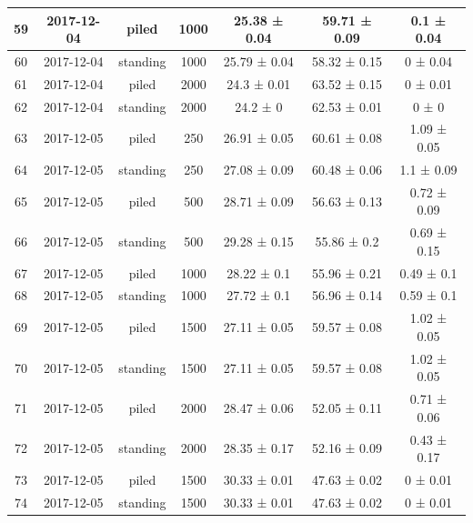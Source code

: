 \documentclass[11pt,a4paper]{article}
\begin{document}
\begin{table}
\begin{tabular}[t]{c|c|c|c|c|c|c}
\hline
59 & 2017-12-04 & piled & 1000 & 25.38  ±  0.04 & 59.71  ±  0.09 & 0.1  ±  0.04\\
\hline
60 & 2017-12-04 & standing & 1000 & 25.79  ±  0.04 & 58.32  ±  0.15 & 0  ±  0.04\\
\hline
61 & 2017-12-04 & piled & 2000 & 24.3  ±  0.01 & 63.52  ±  0.15 & 0  ±  0.01\\
\hline
62 & 2017-12-04 & standing & 2000 & 24.2  ±  0 & 62.53  ±  0.01 & 0  ±  0\\
\hline
63 & 2017-12-05 & piled & 250 & 26.91  ±  0.05 & 60.61  ±  0.08 & 1.09  ±  0.05\\
\hline
64 & 2017-12-05 & standing & 250 & 27.08  ±  0.09 & 60.48  ±  0.06 & 1.1  ±  0.09\\
\hline
65 & 2017-12-05 & piled & 500 & 28.71  ±  0.09 & 56.63  ±  0.13 & 0.72  ±  0.09\\
\hline
66 & 2017-12-05 & standing & 500 & 29.28  ±  0.15 & 55.86  ±  0.2 & 0.69  ±  0.15\\
\hline
67 & 2017-12-05 & piled & 1000 & 28.22  ±  0.1 & 55.96  ±  0.21 & 0.49  ±  0.1\\
\hline
68 & 2017-12-05 & standing & 1000 & 27.72  ±  0.1 & 56.96  ±  0.14 & 0.59  ±  0.1\\
\hline
69 & 2017-12-05 & piled & 1500 & 27.11  ±  0.05 & 59.57  ±  0.08 & 1.02  ±  0.05\\
\hline
70 & 2017-12-05 & standing & 1500 & 27.11  ±  0.05 & 59.57  ±  0.08 & 1.02  ±  0.05\\
\hline
71 & 2017-12-05 & piled & 2000 & 28.47  ±  0.06 & 52.05  ±  0.11 & 0.71  ±  0.06\\
\hline
72 & 2017-12-05 & standing & 2000 & 28.35  ±  0.17 & 52.16  ±  0.09 & 0.43  ±  0.17\\
\hline
73 & 2017-12-05 & piled & 1500 & 30.33  ±  0.01 & 47.63  ±  0.02 & 0  ±  0.01\\
\hline
74 & 2017-12-05 & standing & 1500 & 30.33  ±  0.01 & 47.63  ±  0.02 & 0  ±  0.01\\
\hline
\end{tabular}
\end{table}
\end{document}
